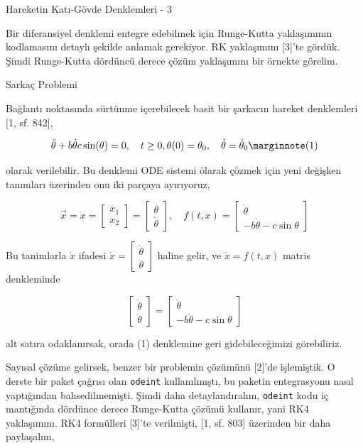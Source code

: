 \documentclass[12pt,fleqn]{article}\usepackage{../../common}
\begin{document}
Hareketin Katı-Gövde Denklemleri - 3

Bir diferansiyel denklemi entegre edebilmek için Runge-Kutta yaklaşımının
kodlamasını detaylı şekilde anlamak gerekiyor. RK yaklaşımını [3]'te gördük.
Şimdi Runge-Kutta dördüncü derece çözüm yaklaşımını bir örnekte görelim.

Sarkaç Problemi

Bağlantı noktasında sürtünme içerebilecek basit bir şarkacın hareket denklemleri
[1, sf. 842],

$$
\ddot{\theta} + b\dot{\theta}  c\sin(\theta) = 0, \quad
t \ge 0, \theta(0)=\theta_0, \quad
\dot{\theta} = \dot{\theta}_0
\mlabel{1}
$$

olarak verilebilir. Bu denklemi ODE sistemi ölarak çözmek için yeni değişken
tanımları üzerinden onu iki parçaya ayırıyoruz,

$$
\vec{x} = x = \left[\begin{array}{ccc}
x_1 \\ x_2
\end{array}\right] = 
\left[\begin{array}{c}
\theta \\ \dot{\theta}
\end{array}\right], \quad
f(t,x) = \left[\begin{array}{c}
\dot{\theta} \\ -b \dot{\theta} - c\sin\theta
\end{array}\right]
$$

Bu tanimlarla $\dot{x}$ ifadesi
$
\dot{x} = \left[\begin{array}{c} \dot{\theta} \\ \ddot{\theta} \end{array}\right]
$
haline gelir,  ve $\dot{x} = f(t,x)$ matris denkleminde 

$$
\left[\begin{array}{c} \dot{\theta} \\ \ddot{\theta} \end{array}\right]=
\left[\begin{array}{c} \dot{\theta} \\ -b \dot{\theta} - c\sin\theta \end{array}\right]
$$

alt satıra odaklanırsak, orada (1) denklemine geri gidebileceğimizi görebiliriz.

Sayısal çözüme gelirsek, benzer bir problemin çözümünü [2]'de işlemiştik.  O
derste bir paket çağrısı olan \verb!odeint! kullanılmıştı, bu paketin
entegrasyonu nasıl yaptığından bahsedilmemişti. Şimdi daha detaylandıralım,
\verb!odeint! kodu iç mantığında dördünce derece Runge-Kutta çözümü kullanır,
yani RK4 yaklaşımını. RK4 formülleri [3]'te verilmişti, [1, sf. 803] üzerinden
bir daha paylaşalım,
\end{document}
